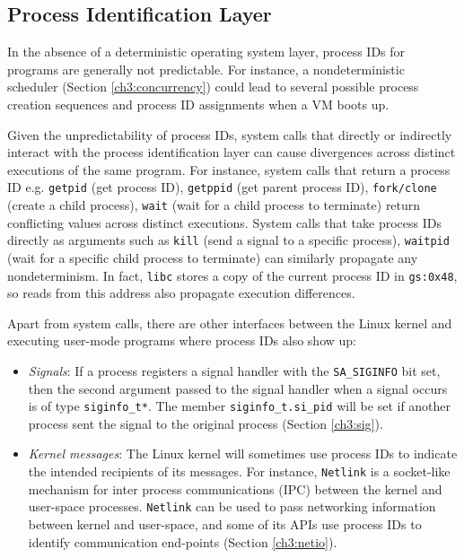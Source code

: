 \subsection{Process Identification Layer} \label{ch3:pid}

In the absence of a deterministic operating system layer, process IDs for
programs are generally not predictable.
For instance, a nondeterministic scheduler (Section \ref{ch3:concurrency}) 
could lead to several possible process creation sequences
and process ID assignments when a VM boots up.
 
Given the unpredictability of process IDs,
system calls that directly or indirectly
interact with the process identification layer can cause divergences
across distinct executions of the same program.
For instance, system calls that return a process ID e.g.
\texttt{getpid} (get process ID), \texttt{getppid} (get
parent process ID), \texttt{fork/clone} (create a child process),
\texttt{wait} (wait for a child process to terminate)
return conflicting values across distinct executions. System calls that take process IDs 
directly as arguments such as \texttt{kill} (send a signal to a specific
process), \texttt{waitpid} (wait for a specific child process to terminate)
can similarly propagate any nondeterminism.
In fact, \texttt{libc} stores a copy of the current process ID in \texttt{gs:0x48},
so reads from this address also propagate execution differences.

Apart from system calls, there are other interfaces
between the Linux kernel and executing user-mode programs
where process IDs also show up:

\begin{itemize} 

\item {\em Signals}: If a process registers a signal handler with the \texttt{SA\_SIGINFO}
bit set, then the second argument passed
to the signal handler when a signal occurs is of type \texttt{siginfo\_t*}.
The member \texttt{siginfo\_t.si\_pid} will
be set if another process sent the signal 
to the original process (Section \ref{ch3:sig}). 

\item {\em Kernel messages}: The Linux kernel will sometimes use process IDs 
to indicate the intended recipients of its messages. 
For instance, \texttt{Netlink} is a socket-like
mechanism for inter process communications (IPC)
between the kernel and user-space processes.
\texttt{Netlink} can be used to pass
networking information between kernel
and user-space, and some of its APIs 
use process IDs to identify communication
end-points (Section \ref{ch3:netio}). \end{itemize}

